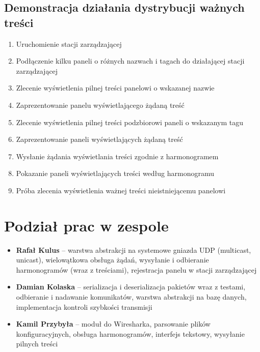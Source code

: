 \documentclass[12pt, a4paper]{article}
\providecommand{\tightlist}{%
  \setlength{\itemsep}{0pt}\setlength{\parskip}{0pt}}
\begin{document}
\hypertarget{demonstracja-dziaux142ania-dystrybucji-waux17cnych-treux15bci}{%
\subsection{Demonstracja działania dystrybucji ważnych treści}\label{demonstracja-dziaux142ania-dystrybucji-waux17cnych-treux15bci}}

\begin{enumerate}
\def\labelenumi{\arabic{enumi}.}
\tightlist
\item
  Uruchomienie stacji zarządzającej
\item
  Podłączenie kilku paneli o różnych nazwach i tagach do działającej
  stacji zarządzającej
\item
  Zlecenie wyświetlenia pilnej treści panelowi o wskazanej nazwie
\item
  Zaprezentowanie panelu wyświetlającego żądaną treść
\item
  Zlecenie wyświetlenia pilnej treści podzbiorowi paneli o wskazanym
  tagu
\item
  Zaprezentowanie paneli wyświetlających żądaną treść
\item
  Wysłanie żądania wyświetlania treści zgodnie z harmonogramem
\item
  Pokazanie paneli wyświetlających treści według harmonogramu
\item
  Próba zlecenia wyświetlenia ważnej treści nieistniejącemu panelowi
\end{enumerate}

\hypertarget{podziaux142-prac-w-zespole}{%
\section{Podział prac w zespole}\label{podziaux142-prac-w-zespole}}

\begin{itemize}
\tightlist
\item
  \textbf{Rafał Kulus} -- warstwa abstrakcji na systemowe gniazda UDP
  (multicast, unicast), wielowątkowa obsługa żądań, wysyłanie i odbieranie harmonogramów (wraz z treściami), rejestracja panelu w stacji zarządzającej
\item
  \textbf{Damian Kolaska} -- serializacja i deserializacja pakietów wraz z testami, odbieranie i nadawanie komunikatów, warstwa abstrakcji na bazę danych, implementacja kontroli szybkości transmisji
\item
  \textbf{Kamil Przybyła} -- moduł do Wiresharka, parsowanie plików konfiguracyjnych, obsługa harmonogramów, interfejs tekstowy, wysyłanie pilnych treści
\end{itemize}
\end{document}
